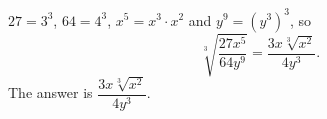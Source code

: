 $27=3^3$, $64=4^3$, $x^5=x^3\cdot x^2$ and $y^9=\left(y^3\right)^3$, so
\[\sqrt[3]{\dfrac{27x^5}{64y^9}}=\dfrac{3x\sqrt[3]{x^2}}{4y^3}.\]
The answer is $\boxed{\dfrac{3x\sqrt[3]{x^2}}{4y^3}}$.

